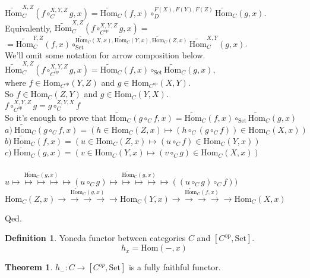 \documentclass[10pt,a4paper]{article}
\theoremstyle{definition}
\newtheorem{definition}{Definition}[section]
\newtheorem{theorem}{Theorem}[section]
\newcommand{\Hom}{{\mbox{Hom}}}
\newcommand{\HomMor}{{\widetilde{\Hom}\mbox{}}}
\newcommand{\op}{{\mbox{op}}}
\newcommand{\Set}{{\mbox{Set}}}
\begin{document}
\begin{enumerate}
$\HomMor_C^{X,Z}(f\circ_C^{X,Y,Z} g, x)=\HomMor_C(f,x)\circ_D^{F(X),F(Y),F(Z)} \HomMor_C(g,x)$.\\
Equivalently, $\HomMor_C^{X,Z}(f\circ_{C^\op}^{X,Y,Z} g, x)=$\\ $=\HomMor_C^{Y,Z}(f,x)\circ_\Set^{\HomMor_C(X,x),\HomMor_C(Y,x),\HomMor_C(Z,x)} \HomMor_C^{X,Y}(g,x)$.\\
We'll omit some notation for arrow composition below.\\
$\HomMor_C^{X,Z}(f\circ_{C^\op}^{X,Y,Z} g, x)=\HomMor_C(f,x)\circ_\Set \HomMor_C(g,x)$,\\
where $f\in\Hom_{C^\op}(Y,Z)$ and $g\in\Hom_{C^\op}(X,Y)$.\\
So $f\in\Hom_{C}(Z,Y)$ and $g\in\Hom_{C}(Y,X)$.\\
$f\circ_{C^\op}^{X,Y,Z} g = g\circ_{C}^{Z,Y,X} f$\\
So it's enough to prove that $\HomMor_C(g\circ_C f, x) = \HomMor_C(f, x) \circ_\Set \HomMor_C(g, x)$\\
$a)\ \HomMor_C(g\circ_C f, x) = (h \in\Hom_C(Z,x) \mapsto (h \circ_C (g\circ_C f))\in\Hom_C(X,x))$\\
$b)\ \HomMor_C(f, x) = \left(u \in\Hom_C(Z,x) \mapsto (u \circ_C f)\in\Hom_C(Y,x)\right)$\\
$c)\ \HomMor_C(g, x) = \left(v \in\Hom_C(Y,x) \mapsto (v \circ_C g)\in\Hom_C\left(X,x\right)\right)$\\
\\
$u \stackrel{\HomMor_C(g, x)}{\mapsto\mapsto\mapsto\mapsto\mapsto} (u \circ_C g)\stackrel{\HomMor_C(g, x)}{\mapsto\mapsto\mapsto\mapsto\mapsto} ((u \circ_C g) \circ_C f))$
\\
$\Hom_C(Z,x) \stackrel{\HomMor_C(g, x)}{\to\to\to\to\to} \Hom_C(Y,x)\stackrel{\HomMor_C(f, x)}{\to\to\to\to\to} \Hom_C(X,x)$
\\
\end{enumerate}
Qed.
\begin{definition}
Yoneda functor between categories $C$ and $[C^\op,\Set]$.
$$h_x = \Hom(-, x)$$
\end{definition}
\begin{theorem}
$h_{-}:C\rightarrow [C^{op},\Set]$ is a fully faithful functor.
\end{theorem}
\end{document}
